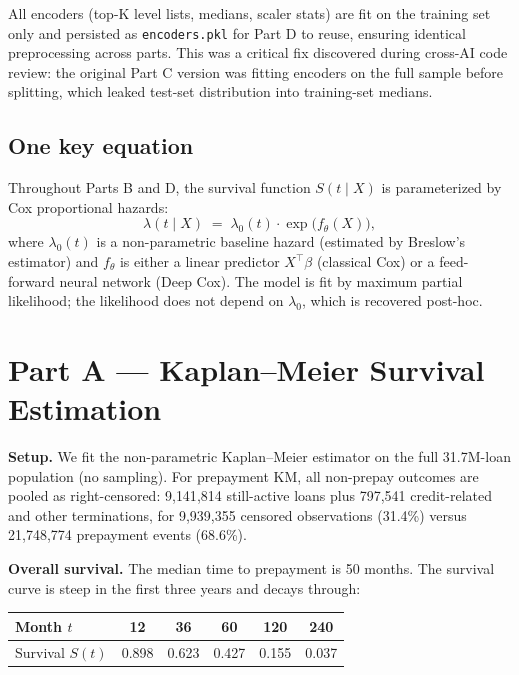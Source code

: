\documentclass[11pt,a4paper]{article}
\begin{document}
All encoders (top-K level lists, medians, scaler stats) are fit on the training set only and persisted as \texttt{encoders.pkl} for Part D to reuse, ensuring identical preprocessing across parts. This was a critical fix discovered during cross-AI code review: the original Part C version was fitting encoders on the full sample before splitting, which leaked test-set distribution into training-set medians.

\subsection{One key equation}

Throughout Parts B and D, the survival function $S(t \mid X)$ is parameterized by Cox proportional hazards:
\begin{equation}
  \lambda(t \mid X) \;=\; \lambda_0(t) \cdot \exp\!\bigl(f_\theta(X)\bigr),
  \label{eq:cox}
\end{equation}
where $\lambda_0(t)$ is a non-parametric baseline hazard (estimated by Breslow's estimator) and $f_\theta$ is either a linear predictor $X^\top \beta$ (classical Cox) or a feed-forward neural network (Deep Cox). The model is fit by maximum partial likelihood; the likelihood does not depend on $\lambda_0$, which is recovered post-hoc.

\section{Part A --- Kaplan--Meier Survival Estimation}

\textbf{Setup.} We fit the non-parametric Kaplan--Meier estimator on the full 31.7M-loan population (no sampling). For prepayment KM, all non-prepay outcomes are pooled as right-censored: 9{,}141{,}814 still-active loans plus 797{,}541 credit-related and other terminations, for 9{,}939{,}355 censored observations (31.4\%) versus 21{,}748{,}774 prepayment events (68.6\%).

\textbf{Overall survival.} The median time to prepayment is 50 months.
The survival curve is steep in the first three years and decays through:
\begin{center}
  \small
  \begin{tabular}{lccccc}
    \toprule
    Month $t$       & 12    & 36    & 60    & 120   & 240   \\
    \midrule
    Survival $S(t)$ & 0.898 & 0.623 & 0.427 & 0.155 & 0.037 \\
    \bottomrule
  \end{tabular}
\end{center}
\end{document}
